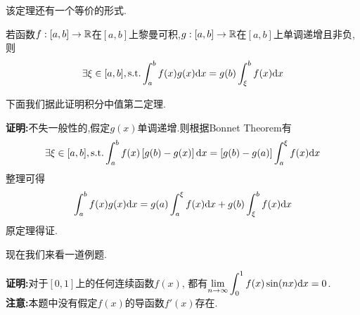 \documentclass{ctexart}
\begin{document}
该定理还有一个等价的形式.
\begin{theorem}
    若函数$f:[a,b]\to\mathbb{R}$在$[a,b]$上黎曼可积,$g:[a,b]\to\mathbb{R}$在$[a,b]$上单调递增且非负,则
    $$\exists\xi\in[a,b],\text{s.t.}\int_{a}^{b}{f(x)g(x)\mathrm{d} x}=g(b)\int_{\xi}^{b}{f(x)\mathrm{d} x}$$
\end{theorem}\noindent
下面我们据此证明积分中值第二定理.
\begin{solution}
    \textbf{证明:}不失一般性的,假定$g(x)$单调递增.则根据Bonnet Theorem有
    $$\exists\xi\in[a,b],\text{s.t.}\int_{a}^{b}{f(x)\left[g(b)-g(x)\right]\mathrm{d} x}=\left[g(b)-g(a)\right]\int_{a}^{\xi}{f(x)\mathrm{d} x}$$
    整理可得$$\int_{a}^{b}{f(x)g(x)\mathrm{d} x}=g(a)\int_{a}^{\xi}{f(x)\mathrm{d} x}+g(b)\int_{\xi}^{b}{f(x)\mathrm{d} x}$$
    原定理得证.
\end{solution}\noindent
现在我们来看一道例题.
\begin{problem}
    \textbf{证明:}对于$[0,1]$上的任何连续函数$f(x)$,
    都有$\displaystyle\lim_{n\to\infty}{\int_{0}^{1}{f(x)\sin(nx)\mathrm{d} x}}=0$.\\
    \textbf{注意:}本题中没有假定$f(x)$的导函数$f'(x)$存在.
\end{problem}
\end{document}
